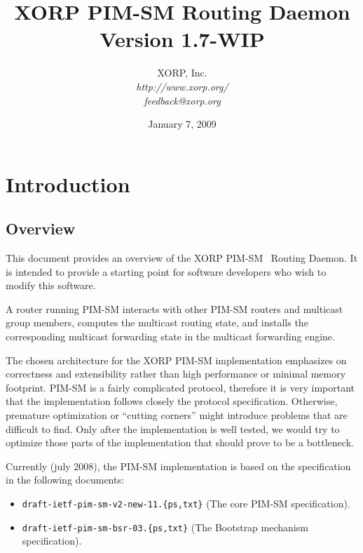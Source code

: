 \documentclass[11pt]{article}
\begin{document}
\title{XORP PIM-SM Routing Daemon \\
\vspace{1ex}
Version 1.7-WIP}
\author{ XORP, Inc.					\\
         {\it http://www.xorp.org/}			\\
	 {\it feedback@xorp.org}
}
\date{January 7, 2009}

\maketitle


\section{Introduction}


\subsection{Overview}

This document provides an overview of the XORP PIM-SM~\cite{PIM-SM}
Routing Daemon. It is intended to provide a starting point for software
developers who wish to modify this software.

A router running PIM-SM interacts with other PIM-SM routers and
multicast group members, computes the multicast routing state, and installs
the corresponding multicast forwarding state in the multicast forwarding
engine.

The chosen architecture for the XORP PIM-SM implementation emphasizes on
correctness and extensibility rather than high performance or minimal
memory footprint. PIM-SM is a fairly complicated protocol, therefore it
is very important that the implementation follows closely the protocol
specification. Otherwise, premature optimization or ``cutting corners''
might introduce problems that are difficult to find. Only after the
implementation is well tested, we would
try to optimize those parts of the implementation that should prove
to be a bottleneck.

Currently (july 2008), the PIM-SM implementation is based
on the specification in the following documents:

\begin{itemize}
  \item \verb=draft-ietf-pim-sm-v2-new-11.{ps,txt}= (The core PIM-SM
  specification).
  \item \verb=draft-ietf-pim-sm-bsr-03.{ps,txt}= (The Bootstrap mechanism
  specification).
\end{itemize}
\end{document}
